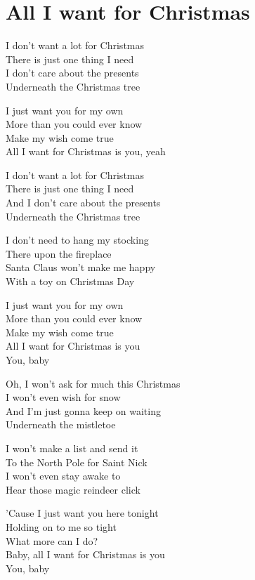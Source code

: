 \section{All I want for Christmas}
I don't want a lot for Christmas\\
There is just one thing I need\\
I don't care about the presents\\
Underneath the Christmas tree

I just want you for my own\\
More than you could ever know\\
Make my wish come true\\
All I want for Christmas is you, yeah

I don't want a lot for Christmas\\
There is just one thing I need\\
And I don't care about the presents\\
Underneath the Christmas tree

I don't need to hang my stocking\\
There upon the fireplace\\
Santa Claus won't make me happy\\
With a toy on Christmas Day

I just want you for my own\\
More than you could ever know\\
Make my wish come true\\
All I want for Christmas is you\\
You, baby

Oh, I won't ask for much this Christmas\\
I won't even wish for snow\\
And I'm just gonna keep on waiting\\
Underneath the mistletoe

I won't make a list and send it\\
To the North Pole for Saint Nick\\
I won't even stay awake to\\
Hear those magic reindeer click

'Cause I just want you here tonight\\
Holding on to me so tight\\
What more can I do?\\
Baby, all I want for Christmas is you\\
You, baby

